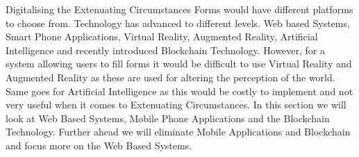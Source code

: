 \documentclass[../main.tex]{subfiles}
\begin{document}
\raggedright
Digitalising the Extenuating Circumstances Forms would have different platforms to choose from. Technology has advanced to different levels. Web based Systems, Smart Phone Applications, Virtual Reality, Augmented Reality, Artificial Intelligence\cite{forbestop7} and recently introduced Blockchain Technology. However, for a system allowing users to fill forms it would be difficult to use Virtual Reality and Augmented Reality as these are used for altering the perception of the world\cite{arvr}. Same goes for Artificial Intelligence as this would be costly to implement and not very useful when it comes to Extenuating Circumstances. In this section we will look at Web Based Systems, Mobile Phone Applications and the Blockchain Technology. Further ahead we will eliminate Mobile Applications and Blockchain and focus more on the Web Based Systems.
\end{document}
